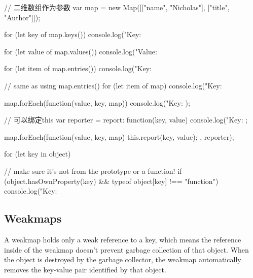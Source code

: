 \begin{JavaScript}

    // 二维数组作为参数
    var map = new Map([["name", "Nicholas"], ["title", "Author"]]);

    for (let key of map.keys()) {
        console.log("Key: %
    }

    for (let value of map.values()) {
        console.log("Value: %
    }

    for (let item of map.entries()) {
        console.log("Key: %
    }

    // same as using map.entries()
    for (let item of map) {
        console.log("Key: %
    }
    
    map.forEach(function(value, key, map)) {
        console.log("Key: %
    });
    
    // 可以绑定this
    var reporter = {
        report: function(key, value) {
            console.log("Key: %
        }
    };

    map.forEach(function(value, key, map) {
        this.report(key, value);
    }, reporter);

\end{JavaScript}


\begin{JavaScript}
    for (let key in object) {

        // make sure it's not from the prototype or a function!
        if (object.hasOwnProperty(key) && typeof object[key] !== "function") {
            console.log("Key: %
        }

    }
\end{JavaScript}


\subsection{Weakmaps}

A weakmap holds only a weak reference to a key, which means the reference inside of the weakmap doesn't prevent garbage collection of that object. When the object is destroyed by the garbage collector, the weakmap automatically removes the key-value pair identified by that object. 

\begin{JavaScript}

\end{JavaScript}

